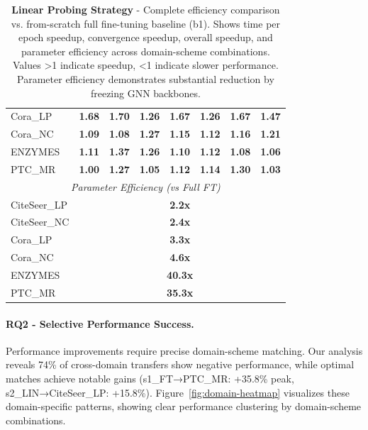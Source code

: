 \documentclass[11pt]{article}
\begin{document}
\begin{table}[t]
\begin{tabular}{l c c c c c c c}
Cora\_LP & \textbf{1.68} & \textbf{1.70} & \textbf{1.26} & \textbf{1.67} & \textbf{1.26} & \textbf{1.67} & \textbf{1.47} \\
Cora\_NC & \textbf{1.09} & \textbf{1.08} & \textbf{1.27} & \textbf{1.15} & \textbf{1.12} & \textbf{1.16} & \textbf{1.21} \\
ENZYMES & \textbf{1.11} & \textbf{1.37} & \textbf{1.26} & \textbf{1.10} & \textbf{1.12} & \textbf{1.08} & \textbf{1.06} \\
PTC\_MR & \textbf{1.00} & \textbf{1.27} & \textbf{1.05} & \textbf{1.12} & \textbf{1.14} & \textbf{1.30} & \textbf{1.03} \\
\midrule
\multicolumn{8}{c}{\textit{Parameter Efficiency (vs Full FT)}} \\
CiteSeer\_LP & \multicolumn{7}{c}{\textbf{2.2x}} \\
CiteSeer\_NC & \multicolumn{7}{c}{\textbf{2.4x}} \\
Cora\_LP & \multicolumn{7}{c}{\textbf{3.3x}} \\
Cora\_NC & \multicolumn{7}{c}{\textbf{4.6x}} \\
ENZYMES & \multicolumn{7}{c}{\textbf{40.3x}} \\
PTC\_MR & \multicolumn{7}{c}{\textbf{35.3x}} \\
\bottomrule
\end{tabular}
\caption{\textbf{Linear Probing Strategy} - Complete efficiency comparison vs. from-scratch full fine-tuning baseline (b1). Shows time per epoch speedup, convergence speedup, overall speedup, and parameter efficiency across domain-scheme combinations. Values >1 indicate speedup, <1 indicate slower performance. Parameter efficiency demonstrates substantial reduction by freezing GNN backbones.}
\label{tab:linear-probing}
\end{table}

\paragraph{RQ2 - Selective Performance Success.} Performance improvements require precise domain-scheme matching. Our analysis reveals 74\% of cross-domain transfers show negative performance, while optimal matches achieve notable gains (s1\_FT→PTC\_MR: +35.8\% peak, s2\_LIN→CiteSeer\_LP: +15.8\%). Figure~\ref{fig:domain-heatmap} visualizes these domain-specific patterns, showing clear performance clustering by domain-scheme combinations.
\end{document}
